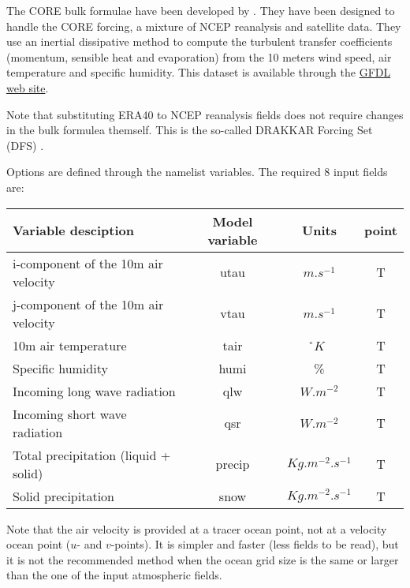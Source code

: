 \documentclass[NEMO_book]{subfiles}
\begin{document}
The CORE bulk formulae have been developed by \citet{Large_Yeager_Rep04}. 
They have been designed to handle the CORE forcing, a mixture of NCEP 
reanalysis and satellite data. They use an inertial dissipative method to compute 
the turbulent transfer coefficients (momentum, sensible heat and evaporation) 
from the 10 meters wind speed, air temperature and specific humidity.
This \citet{Large_Yeager_Rep04} dataset is available through the 
\href{http://nomads.gfdl.noaa.gov/nomads/forms/mom4/CORE.html}{GFDL web site}. 

Note that substituting ERA40 to NCEP reanalysis fields 
does not require changes in the bulk formulea themself. 
This is the so-called DRAKKAR Forcing Set (DFS) \citep{Brodeau_al_OM09}. 

Options are defined through the   namelist variables.
The required 8 input fields are:

\begin{table}[htbp]   \label{Tab_CORE}
\begin{center}
\begin{tabular}{|l|c|c|c|}
\hline
Variable desciption					& Model variable	& Units	 & point \\		\hline
i-component of the 10m air velocity	& utau		& $m.s^{-1}$			& T  \\ 	\hline
j-component of the 10m air velocity	& vtau		& $m.s^{-1}$			& T  \\	\hline
10m air temperature					& tair		& \r{}$K$				& T 	\\	\hline
Specific humidity					& humi		& \%					& T \\		\hline
Incoming long wave radiation		& qlw		& $W.m^{-2}$			& T \\		\hline
Incoming short wave radiation		& qsr		& $W.m^{-2}$			& T \\		\hline
Total precipitation (liquid + solid)	& precip	& $Kg.m^{-2}.s^{-1}$	& T \\ 	\hline
Solid precipitation					& snow		& $Kg.m^{-2}.s^{-1}$	& T \\	\hline
\end{tabular}
\end{center}
\end{table}

Note that the air velocity is provided at a tracer ocean point, not at a velocity ocean 
point ($u$- and $v$-points). It is simpler and faster (less fields to be read), 
but it is not the recommended method when the ocean grid size is the same 
or larger than the one of the input atmospheric fields.
\end{document}
